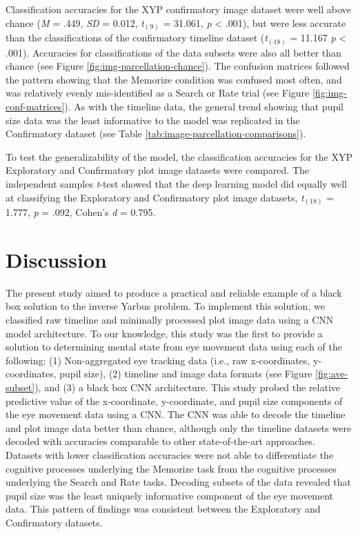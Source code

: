 \documentclass[
  english,
  man,floatsintext]{apa6}
\begin{document}
Classification accuracies for the XYP confirmatory image dataset were well above chance (\emph{M} = .449, \emph{SD} = 0.012, \emph{t}\(_{(9)}\) = 31.061, \emph{p} \textless{} .001), but were less accurate than the classifications of the confirmatory timeline dataset (\emph{t}\(_{(18)}\) = 11.167 \emph{p} \textless{} .001). Accuracies for classifications of the data subsets were also all better than chance (see Figure \ref{fig:img-parcellation-chance}). The confusion matrices followed the pattern showing that the Memorize condition was confused most often, and was relatively evenly mis-identified as a Search or Rate trial (see Figure \ref{fig:img-conf-matrices}). As with the timeline data, the general trend showing that pupil size data was the least informative to the model was replicated in the Confirmatory dataset (see Table \ref{tab:image-parcellation-comparisons}).

To test the generalizability of the model, the classification accuracies for the XYP Exploratory and Confirmatory plot image datasets were compared. The independent samples \emph{t}-test showed that the deep learning model did equally well at classifying the Exploratory and Confirmatory plot image datasets, \emph{t}\(_{(18)}\) = 1.777, \emph{p} = .092, Cohen's \emph{d} = 0.795.

\section{Discussion}

The present study aimed to produce a practical and reliable example of a black box solution to the inverse Yarbus problem. To implement this solution, we classified raw timeline and minimally processed plot image data using a CNN model architecture. To our knowledge, this study was the first to provide a solution to determining mental state from eye movement data using each of the following: (1) Non-aggregated eye tracking data (i.e., raw x-coordinates, y-coordinates, pupil size), (2) timeline and image data formats (see Figure \ref{fig:ave-subset}), and (3) a black box CNN architecture. This study probed the relative predictive value of the x-coordinate, y-coordinate, and pupil size components of the eye movement data using a CNN. The CNN was able to decode the timeline and plot image data better than chance, although only the timeline datasets were decoded with accuracies comparable to other state-of-the-art approaches. Datasets with lower classification accuracies were not able to differentiate the cognitive processes underlying the Memorize task from the cognitive processes underlying the Search and Rate tasks. Decoding subsets of the data revealed that pupil size was the least uniquely informative component of the eye movement data. This pattern of findings was consistent between the Exploratory and Confirmatory datasets.
\end{document}
